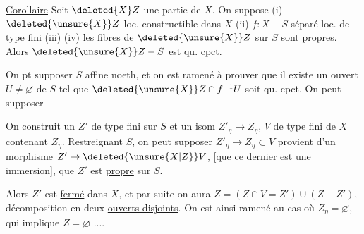 \uline{Corollaire} Soit $\deleted{X}Z$ une partie de $X$. On
suppose (i) $\deleted{\unsure{X}}Z$ loc. constructible dans $X$
(ii) $f:X-S$ séparé loc. de type fini (iii) 
 (iv) les fibres de
$\deleted{\unsure{X}}Z$ sur $S$ sont \uline{propres}. Alors $\deleted{\unsure{X}}Z-S$ est
qu. cpct.

On pt supposer $S$ affine  noeth, et on est
ramené à prouver que  il existe un ouvert $U\ne\varnothing$
de $S$ tel que $\deleted{\unsure{X}}Z\cap f^{-1}U$ soit qu. cpct. On peut supposer

On construit un $Z'$ de type fini sur $S$ et un
isom $Z'_\eta\to Z_\eta$,  
$V$ de type fini de $X$ contenant $Z_\eta$. Restreignant $S$,
on peut supposer $Z'_\eta\to Z_\eta\subset V$ provient d'un
morphisme $Z'\to\deleted{\unsure{X|Z}}V$, [que ce dernier est
une immersion],  que $Z'$ est \uline{propre} sur $S$.

Alors $Z'$ est \uline{fermé} dans $X$, et par suite on
aura $Z=(Z\cap V=Z')\cup(Z-Z')$, décomposition
 en deux \uline{ouverts  disjoints}. On est
ainsi ramené au cas où $Z_\eta=\varnothing$,
qui implique $Z=\varnothing$ ....
